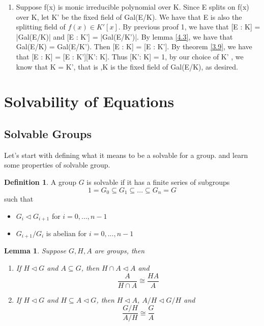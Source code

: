 \documentclass[a4paper, 10pt]{article}
\theoremstyle{plain}
\newtheorem{lema}[teorema]{Lemma}
\theoremstyle{definition}
\newtheorem{definicion}[teorema]{Definition}
\theoremstyle{remark}
\begin{document}
\begin{enumerate}
Then by lemma \ref{4.4}, we know that $Gal(E/K) = Gal(E/ \phi (K)$, thus $ \phi $ is an automorphism of K. By
the first isomorphism theorem, we have that Gal(E/F)/Gal(E/K) is isomorphic to a subgroup of
Gal(K/F). By part 1 we proved, we have that $[K : F] = |Gal(E/F)|/|Gal(E/K)| \leq |Gal(K/F)|$

Since $|Gal(K/F) \leq [K : F] = |Gal(E/F)/Gal(E/K)|$. Then by simple algebraic calculation of the
degrees, we know that this subgroup is Gal(K/F) itself, thus $Gal(K/F) \cong Gal(E/F)/Gal(E/K)$, as
desired.

    \item Suppose f(x) is monic irreducible polynomial over K. Since E splits on f(x) over K, let K' be the
fixed field of Gal(E/K). We have that E is also the splitting field of $f(x) \in K'[x]$.  By previous proof 1, 
we have that [E : K] = |Gal(E/K)| and [E : K'] = |Gal(E/K')|.
By lemma \ref{4.3}, we have that Gal(E/K) = Gal(E/K').
Then [E : K] = [E : K']. By theorem \ref{3.9}, we have that
[E : K] = [E : K'][K': K]. Thus [K': K] = 1, by our choice of K'
, we know that K = K', that is ,K
is the fixed field of Gal(E/K), as desired.

    \end{enumerate}
	
	
    \bigskip
    \section{Solvability of Equations}
    \subsection{Solvable Groups}
    Let's start with defining what it means to be a solvable for a group. and learn some properties of solvable group.

    \begin{definicion}
        A group $G$ is solvable if it has a finite series of subgroups
        \[1=G_0\subseteq G_1\subseteq ... \subseteq G_n = G\]
        such that
        \begin{itemize}
            \item $G_i\vartriangleleft G_{i+1}$ for $i=0,...,n-1$
            \item $G_{i+1}/G_i$ is abelian for $i=0,...,n-1$
        \end{itemize}
    \end{definicion}

    \begin{lema}\label{lema1}
        Suppose $G,H,A$ are groups, then
        \begin{enumerate}
            \item If $H\vartriangleleft G$ and $A\subseteq G$, then $H\cap A \vartriangleleft A$ and 
            \[\frac{A}{H\cap A}\cong \frac{HA}{A}\]
            \item If $H\vartriangleleft G$ and $H\subseteq A \vartriangleleft G$, then $H\vartriangleleft A$, $A/H\vartriangleleft G/H$ and 
            \[\frac{G/H}{A/H}\cong \frac{G}{A}\]
        \end{enumerate}
    \end{lema}
\end{document}
